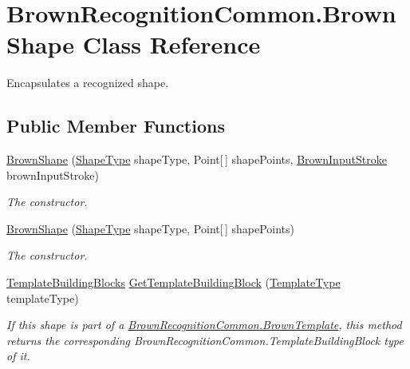 \hypertarget{class_brown_recognition_common_1_1_brown_shape}{
\section{\-Brown\-Recognition\-Common.\-Brown\-Shape \-Class \-Reference}
\label{class_brown_recognition_common_1_1_brown_shape}
}


\-Encapsulates a recognized shape.  


\subsection*{\-Public \-Member \-Functions}
\begin{DoxyCompactItemize}
\item 
\hyperlink{class_brown_recognition_common_1_1_brown_shape_a11bb94ec786da30563f148b3b7383a17}{\-Brown\-Shape} (\hyperlink{namespace_brown_recognition_common_a86340ddb3d90188573ed7b4484046ec3}{\-Shape\-Type} shape\-Type, \-Point\mbox{[}$\,$\mbox{]} shape\-Points, \hyperlink{class_brown_recognition_common_1_1_brown_input_stroke}{\-Brown\-Input\-Stroke} brown\-Input\-Stroke)
\begin{DoxyCompactList}\small\item\em \-The constructor. \end{DoxyCompactList}\item 
\hyperlink{class_brown_recognition_common_1_1_brown_shape_a49afba9e4b61fd9de308a65a48302ab2}{\-Brown\-Shape} (\hyperlink{namespace_brown_recognition_common_a86340ddb3d90188573ed7b4484046ec3}{\-Shape\-Type} shape\-Type, \-Point\mbox{[}$\,$\mbox{]} shape\-Points)
\begin{DoxyCompactList}\small\item\em \-The constructor. \end{DoxyCompactList}\item 
\hyperlink{namespace_brown_recognition_common_a7392e1ad819495147e6f96b995309138}{\-Template\-Building\-Blocks} \hyperlink{class_brown_recognition_common_1_1_brown_shape_a5d4cdc9617b5c82cd9fd1212dfc61ce6}{\-Get\-Template\-Building\-Block} (\hyperlink{namespace_brown_recognition_common_a08ddb81441b8ac27fc140488e6dbb160}{\-Template\-Type} template\-Type)
\begin{DoxyCompactList}\small\item\em \-If this shape is part of a \hyperlink{class_brown_recognition_common_1_1_brown_template}{\-Brown\-Recognition\-Common.\-Brown\-Template}, this method returns the corresponding \-Brown\-Recognition\-Common.\-Template\-Building\-Block type of it. \end{DoxyCompactList}\item 

\end{DoxyCompactItemize}
